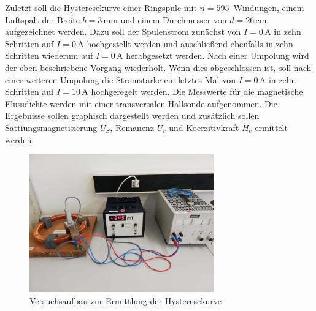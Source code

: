 Zuletzt soll die Hysteresekurve einer Ringspule mit $n = 595\,$ Windungen, einem Luftspalt der 
Breite $b = 3\, \si{\milli\meter}$ und einem Durchmesser von $d = 26\, \si{\centi\meter}$ aufgezeichnet werden. Dazu
soll der Spulenstrom zunächst von $I = 0\, \si{\ampere}$ in zehn Schritten auf $I = 0\, \si{\ampere}$ hochgestellt werden 
und anschließend ebenfalls in zehn Schritten wiederum auf $I = 0\, \si{\ampere}$ herabgesetzt werden. Nach einer Umpolung 
wird der eben beschriebene Vorgang wiederholt. Wenn dies abgeschlossen ist, soll nach einer weiteren Umpolung die Stromstärke
ein letztes Mal von $I = 0\, \si{\ampere}$ in zehn Schritten auf $I = 10\, \si{\ampere}$ hochgeregelt werden. Die 
Messwerte für die magnetische Flussdichte werden mit einer transversalen Hallsonde aufgenommen. Die Ergebnisse sollen 
graphisch dargestellt werden und zusätzlich sollen Sättiungsmagnetisierung $U_S$, Remanenz $U_r$ und 
Koerzitivkraft $H_c$ ermittelt werden.

\begin{figure}[H]
    \centering
    \includegraphics{Ringspule.jpg}
    \caption{Versuchsaufbau zur Ermittlung der Hysteresekurve}
    \label{Ringspule}
\end{figure}